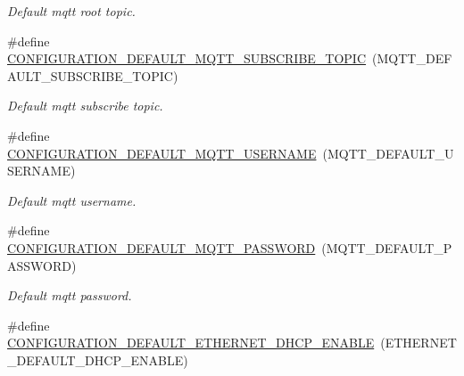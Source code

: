 \begin{DoxyCompactItemize}
\begin{DoxyCompactList}\small\item\em Default mqtt root topic. \end{DoxyCompactList}\item 
\mbox{\label{rmap-config_8h_ad5f5c2f91406f76021e58aaebb4fe84d}} 
\#define \hyperlink{rmap-config_8h_ad5f5c2f91406f76021e58aaebb4fe84d}{C\+O\+N\+F\+I\+G\+U\+R\+A\+T\+I\+O\+N\+\_\+\+D\+E\+F\+A\+U\+L\+T\+\_\+\+M\+Q\+T\+T\+\_\+\+S\+U\+B\+S\+C\+R\+I\+B\+E\+\_\+\+T\+O\+P\+IC}~(M\+Q\+T\+T\+\_\+\+D\+E\+F\+A\+U\+L\+T\+\_\+\+S\+U\+B\+S\+C\+R\+I\+B\+E\+\_\+\+T\+O\+P\+IC)
\begin{DoxyCompactList}\small\item\em Default mqtt subscribe topic. \end{DoxyCompactList}\item 
\mbox{\label{rmap-config_8h_a4606b704d26885b00b68c8e7d1c4b77a}} 
\#define \hyperlink{rmap-config_8h_a4606b704d26885b00b68c8e7d1c4b77a}{C\+O\+N\+F\+I\+G\+U\+R\+A\+T\+I\+O\+N\+\_\+\+D\+E\+F\+A\+U\+L\+T\+\_\+\+M\+Q\+T\+T\+\_\+\+U\+S\+E\+R\+N\+A\+ME}~(M\+Q\+T\+T\+\_\+\+D\+E\+F\+A\+U\+L\+T\+\_\+\+U\+S\+E\+R\+N\+A\+ME)
\begin{DoxyCompactList}\small\item\em Default mqtt username. \end{DoxyCompactList}\item 
\mbox{\label{rmap-config_8h_a93f4ec08026dd0e8eaffc77a72986283}} 
\#define \hyperlink{rmap-config_8h_a93f4ec08026dd0e8eaffc77a72986283}{C\+O\+N\+F\+I\+G\+U\+R\+A\+T\+I\+O\+N\+\_\+\+D\+E\+F\+A\+U\+L\+T\+\_\+\+M\+Q\+T\+T\+\_\+\+P\+A\+S\+S\+W\+O\+RD}~(M\+Q\+T\+T\+\_\+\+D\+E\+F\+A\+U\+L\+T\+\_\+\+P\+A\+S\+S\+W\+O\+RD)
\begin{DoxyCompactList}\small\item\em Default mqtt password. \end{DoxyCompactList}\item 
\mbox{\label{rmap-config_8h_aedfe334cb469b9ad487a0ba637d29662}} 
\#define \hyperlink{rmap-config_8h_aedfe334cb469b9ad487a0ba637d29662}{C\+O\+N\+F\+I\+G\+U\+R\+A\+T\+I\+O\+N\+\_\+\+D\+E\+F\+A\+U\+L\+T\+\_\+\+E\+T\+H\+E\+R\+N\+E\+T\+\_\+\+D\+H\+C\+P\+\_\+\+E\+N\+A\+B\+LE}~(E\+T\+H\+E\+R\+N\+E\+T\+\_\+\+D\+E\+F\+A\+U\+L\+T\+\_\+\+D\+H\+C\+P\+\_\+\+E\+N\+A\+B\+LE)

\end{DoxyCompactItemize}
